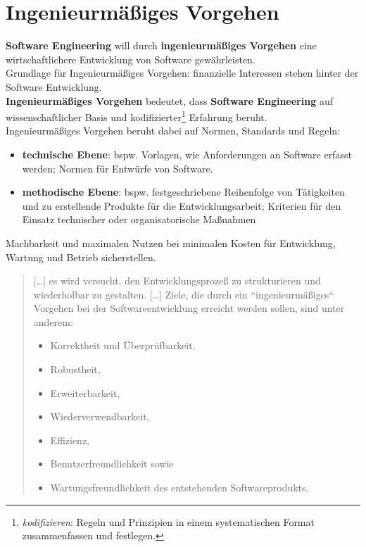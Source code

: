 \section{Ingenieurmäßiges Vorgehen}

\begin{tcolorbox}[title=Ingenieurmäßiges Vorgehen]
\textbf{Software Engineering} will durch \textbf{ingenieurmäßiges Vorgehen} eine wirtschaftlichere Entwicklung von Software gewährleisten.\\
Grundlage für Ingenieurmäßiges Vorgehen: finanzielle Interessen stehen hinter der Software Entwicklung.\\

\noindent
\textbf{Ingenieurmäßiges Vorgehen} bedeutet, dass \textbf{Software Engineering} auf wissenschaftlicher Basis und kodifizierter\footnote{
    \textit{kodifizieren}: Regeln und Prinzipien in einem systematischen Format zusammenfassen und festlegen.
} Erfahrung beruht.\\

\noindent
Ingenieurmäßiges Vorgehen beruht dabei auf Normen, Standards und Regeln:

\begin{itemize}
    \item\textbf{technische Ebene}: bspw. Vorlagen, wie Anforderungen an Software erfasst werden; Normen für Entwürfe von Software.
    \item \textbf{methodische Ebene}: bspw. festgeschriebene Reihenfolge von Tätigkeiten und zu erstellende Produkte für die Entwicklungsarbeit; Kriterien für den Einsatz technischer oder organisatorische Maßnahmen
\end{itemize}
\end{tcolorbox}


\begin{tcolorbox}[title=Ziele des Ingenieurmäßigen Vorgehens]
Machbarkeit und maximalen Nutzen bei minimalen Kosten für Entwicklung, Wartung und Betrieb sicherstellen.\\

\blockquote[{\cite[2]{SR94}}]{
[\ldots] es wird versucht, den
Entwicklungsprozeß zu strukturieren und wiederholbar zu gestalten.
[\ldots]
Ziele, die durch ein ``ingenieurmäßiges`` Vorgehen bei der Softwareentwicklung erreicht werden sollen, sind unter anderem:
\begin{itemize}
    \item Korrektheit und Überprüfbarkeit,
    \item  Robustheit,
    \item  Erweiterbarkeit,
    \item  Wiederverwendbarkeit,
    \item  Effizienz,
    \item  Benutzerfreundlichkeit sowie
    \item  Wartungsfreundlichkeit des entstehenden Softwareprodukts.
\end{itemize}
}
\end{tcolorbox}